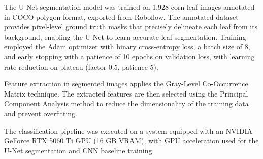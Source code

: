 \documentclass[10pt,a4paper]{article}
\begin{document}
The U-Net segmentation model was trained on 1,928 corn leaf images annotated in COCO polygon format, exported from Roboflow. The annotated dataset provides pixel-level ground truth masks that precisely delineate each leaf from its background, enabling the U-Net to learn accurate leaf segmentation. Training employed the Adam optimizer with binary cross-entropy loss, a batch size of 8, and early stopping with a patience of 10 epochs on validation loss, with learning rate reduction on plateau (factor 0.5, patience 5). 

Feature extraction in segmented images applies the Gray-Level Co-Occurrence Matrix technique. The extracted features are then selected using the Principal Component Analysis method to reduce the dimensionality of the training data and prevent overfitting. 


The classification pipeline was executed on a system equipped with an NVIDIA GeForce RTX 5060 Ti GPU (16 GB VRAM), with GPU acceleration used for the U-Net segmentation and CNN baseline training.
\end{document}
